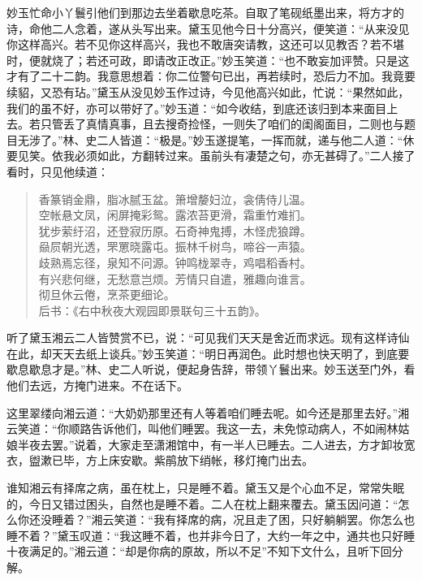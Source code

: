 \documentclass[12pt,oneside]{book}
\newenvironment{shici}{%
\begin{verse}%
\centering\large\hspace{12pt}}%
{\end{verse}}
\begin{document}
妙玉忙命小丫鬟引他们到那边去坐着歇息吃茶。自取了笔砚纸墨出来，将方才的诗，命他二人念着，遂从头写出来。黛玉见他今日十分高兴，便笑道：“从来没见你这样高兴。若不见你这样高兴，我也不敢唐突请教，这还可以见教否？若不堪时，便就烧了；若还可政，即请改正改正。”妙玉笑道：“也不敢妄加评赞。只是这才有了二十二韵。我意思想着：你二位警句已出，再若续时，恐后力不加。我竟要续貂，又恐有玷。”黛玉从没见妙玉作过诗，今见他高兴如此，忙说：“果然如此，我们的虽不好，亦可以带好了。”妙玉道：“如今收结，到底还该归到本来面目上去。若只管丢了真情真事，且去搜奇捡怪，一则失了咱们的闺阁面目，二则也与题目无涉了。”林、史二人皆道：“极是。”妙玉遂提笔，一挥而就，递与他二人道：“休要见笑。依我必须如此，方翻转过来。虽前头有凄楚之句，亦无甚碍了。”二人接了看时，只见他续道：

\begin{shici}
香篆销金鼎，脂冰腻玉盆。箫增嫠妇泣，衾倩侍儿温。\\
空帐悬文凤，闲屏掩彩鸳。露浓苔更滑，霜重竹难扪。\\
犹步萦纡沼，还登寂历原。石奇神鬼搏，木怪虎狼蹲。\\
赑屃朝光透，罘罳晓露屯。振林千树鸟，啼谷一声猿。\\
歧熟焉忘径，泉知不问源。钟鸣栊翠寺，鸡唱稻香村。\\
有兴悲何继，无愁意岂烦。芳情只自遣，雅趣向谁言。\\
彻旦休云倦，烹茶更细论。\\
后书：《右中秋夜大观园即景联句三十五韵》。
\end{shici}

听了黛玉湘云二人皆赞赏不已，说：“可见我们天天是舍近而求远。现有这样诗仙在此，却天天去纸上谈兵。”妙玉笑道：“明日再润色。此时想也快天明了，到底要歇息歇息才是。”林、史二人听说，便起身告辞，带领丫鬟出来。妙玉送至门外，看他们去远，方掩门进来。不在话下。

这里翠缕向湘云道：“大奶奶那里还有人等着咱们睡去呢。如今还是那里去好。”湘云笑道：“你顺路告诉他们，叫他们睡罢。我这一去，未免惊动病人，不如闹林姑娘半夜去罢。”说着，大家走至潇湘馆中，有一半人已睡去。二人进去，方才卸妆宽衣，盥漱已毕，方上床安歇。紫鹃放下绡帐，移灯掩门出去。

谁知湘云有择席之病，虽在枕上，只是睡不着。黛玉又是个心血不足，常常失眠的，今日又错过困头，自然也是睡不着。二人在枕上翻来覆去。黛玉因问道：“怎么你还没睡着？”湘云笑道：“我有择席的病，况且走了困，只好躺躺罢。你怎么也睡不着？”黛玉叹道：“我这睡不着，也并非今日了，大约一年之中，通共也只好睡十夜满足的。”湘云道：“却是你病的原故，所以不足”不知下文什么，且听下回分解。
 
 
\end{document}
